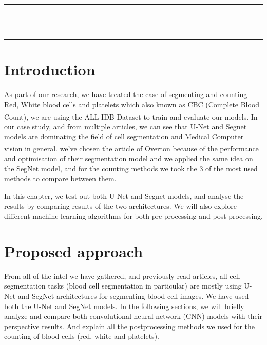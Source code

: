 \thispagestyle{empty}
\vspace*{\fill}
\begin{center}
    {\color{Black} \rule{\linewidth}{1.2mm} }\\
\vspace{0.25in}
{\centering{}}
\vspace{0.35in}\\
    {\color{Black} \rule{\linewidth}{1.2mm} }
\end{center}
\vspace*{\fill}
\setcounter{section}{0}

\newpage

\section{Introduction}
\vspace{0.2in}
\hspace{\parindent}
As part of our research, we have treated the case of segmenting and counting Red, White blood cells and platelets which also known as CBC (Complete Blood Count), we are using the ALL-IDB\textsuperscript{\cite{pm77-2n23-20}} Dataset to train and evaluate our models.
In our case study, and from multiple articles, we can see that U-Net and Segnet models are dominating the field of cell segmentation and Medical Computer vision in general. we've chosen the article of Overton \textsuperscript{\cite{10.1007/978-3-030-44584-3_31}} because of the performance and optimisation of their segmentation model and we applied the same idea on the SegNet model, and for the counting methods we took the 3 of the most used methods to compare between them.

In this chapter, we test-out both U-Net and Segnet models, and analyse the results by comparing results of the two architectures.
We will also explore different machine learning algorithms for both pre-processing and post-processing.

\section{Proposed approach}
\vspace{0.2in}
\hspace{\parindent}
From all of the intel we have gathered, and previously read articles, all cell segmentation tasks (blood cell segmentation in particular) are mostly using U-Net and SegNet architectures for segmenting blood cell images.
We have used both the U-Net and SegNet models.
In the following sections, we will briefly analyze and compare both convolutional neural network (CNN) models with their perspective results.
And explain all the postprocessing methods we used for the counting of blood cells (red, white and platelets).

